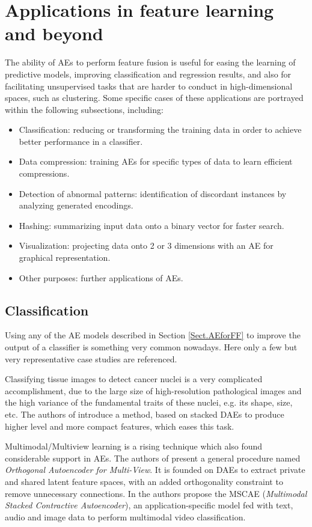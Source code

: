 \section{Applications in feature learning and beyond}\label{Sec.Applications}

The ability of AEs to perform feature fusion is useful for easing the learning of predictive models, improving classification and regression results, and also for facilitating unsupervised tasks that are harder to conduct in high-dimensional spaces, such as clustering. Some specific cases of these applications are portrayed within the following subsections, including:
\begin{itemize}
\item Classification: reducing or transforming the training data in order to achieve better performance in a classifier.
\item Data compression: training AEs for specific types of data to learn efficient compressions.
\item Detection of abnormal patterns: identification of discordant instances by analyzing generated encodings.
\item Hashing: summarizing input data onto a binary vector for faster search.
\item Visualization: projecting data onto 2 or 3 dimensions with an AE for graphical representation.
\item Other purposes: further applications of AEs.
\end{itemize}

\subsection{Classification}
Using any of the AE models described in Section \ref{Sect.AEforFF} to improve the output of a classifier is something very common nowadays. Here only a few but very representative case studies are referenced.

Classifying tissue images to detect cancer nuclei is a very complicated accomplishment, due to the large size of high-resolution pathological images and the high variance of the fundamental traits of these nuclei, e.g. its shape, size, etc. The authors of \cite{Xu2016} introduce a method, based on stacked DAEs to produce higher level and more compact features, which eases this task.

Multimodal/Multiview learning \cite{MultiviewLearning} is a rising technique which also found considerable support in AEs. The authors of \cite{tian_learning_2016} present a general procedure named \textit{Orthogonal Autoencoder for Multi-View}. It is founded on DAEs to extract private and shared latent feature spaces, with an added orthogonality constraint to remove unnecessary connections. In \cite{liu_multimodal_2016} the authors propose the MSCAE (\textit{Multimodal Stacked Contractive Autoencoder}), an application-specific model fed with text, audio and image data to perform multimodal video classification. 

